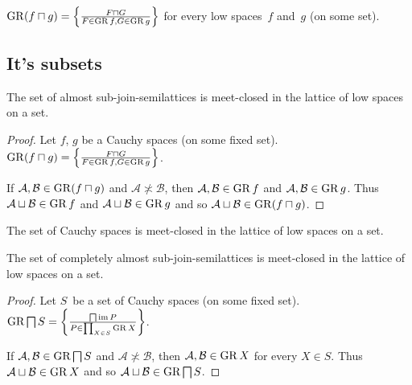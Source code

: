 \begin{cor}
$\operatorname{GR}(f\sqcap g) = \left\{ \frac{F\sqcap G}{F\in\operatorname{GR} f,G\in\operatorname{GR} g}\right\}$ for every low spaces~$f$ and~$g$ (on some set).
\end{cor}




\subsection{It's subsets}

\begin{prop}
The set of almost sub-join-semilattices is meet-closed in the lattice of low spaces on a set.
\end{prop}

\begin{proof}
Let $f$, $g$ be a Cauchy spaces (on some fixed set). $\operatorname{GR}(f\sqcap g) = \left\{ \frac{F\sqcap G}{F\in\operatorname{GR} f,G\in\operatorname{GR} g}\right\}$.

If $\mathcal{A}, \mathcal{B} \in \operatorname{GR}(f\sqcap g)$ and $\mathcal{A}
\nasymp \mathcal{B}$, then $\mathcal{A}, \mathcal{B} \in \operatorname{GR} f$ and $\mathcal{A}, \mathcal{B} \in \operatorname{GR} g$.
Thus $\mathcal{A}\sqcup\mathcal{B}\in\operatorname{GR} f$ and $\mathcal{A}\sqcup\mathcal{B}\in\operatorname{GR} g$ and so
$\mathcal{A} \sqcup \mathcal{B} \in \operatorname{GR}(f\sqcap g)$.
\end{proof}

\begin{cor}
The set of Cauchy spaces is meet-closed in the lattice of low spaces on a set.
\end{cor}

\begin{prop}
The set of completely almost sub-join-semilattices is meet-closed in the lattice of low spaces on a set.
\end{prop}

\begin{proof}
Let $S$~be a set of Cauchy spaces (on some fixed set). $\operatorname{GR} \bigsqcap S = \left\{ \frac{ \bigsqcap
\operatorname{im} P }{ P \in \prod_{X \in S} \operatorname{GR} X}\right\}$.

If $\mathcal{A}, \mathcal{B} \in \operatorname{GR} \bigsqcap S$ and $\mathcal{A}
\nasymp \mathcal{B}$, then $\mathcal{A}, \mathcal{B} \in \operatorname{GR} X$ for
every $X \in S$. Thus $\mathcal{A} \sqcup \mathcal{B} \in \operatorname{GR} X$ and so
$\mathcal{A} \sqcup \mathcal{B} \in \operatorname{GR} \bigsqcap S$.
\end{proof}


